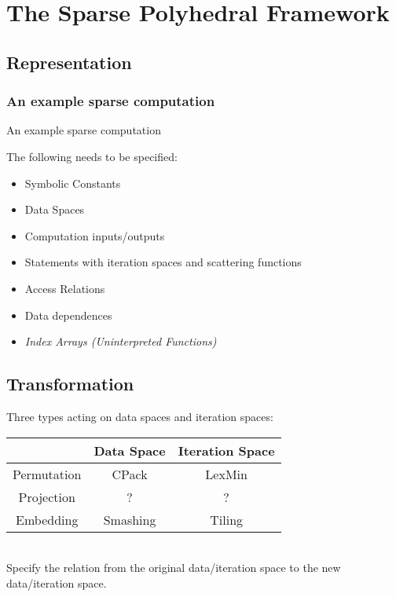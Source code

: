 \documentclass[t,handout]{beamer}
\begin{document}
\section{The Sparse Polyhedral Framework}

\subsection{Representation}
\begin{frame}
\frametitle{An example sparse computation}
\end{frame}
\begin{frame}[fragile]
\begin{exampleblock}{An example sparse computation}
\texttt{}
\end{exampleblock}
\end{frame}

\begin{frame}
\LARGE
The following needs to be specified:
\begin{itemize}
\item Symbolic Constants
\item Data Spaces
\item Computation inputs/outputs
\item Statements with iteration spaces and scattering functions
\item Access Relations
\item Data dependences
\item \emph{Index Arrays (Uninterpreted Functions)}
\end{itemize}
\end{frame}

\subsection{Transformation}
\begin{frame}
Three types acting on data spaces and iteration spaces:
\bigskip{}
\begin{tabular}{|c||c|c|}
\hline 
 & Data Space & Iteration Space\tabularnewline
\hline 
Permutation & CPack & LexMin\tabularnewline
\hline 
Projection & ? & ?\tabularnewline
\hline 
Embedding & Smashing & Tiling\tabularnewline
\hline
\end{tabular}\\
\bigskip{}
Specify the relation from the original data/iteration space to the new data/iteration space.
\end{frame}
\end{document}
